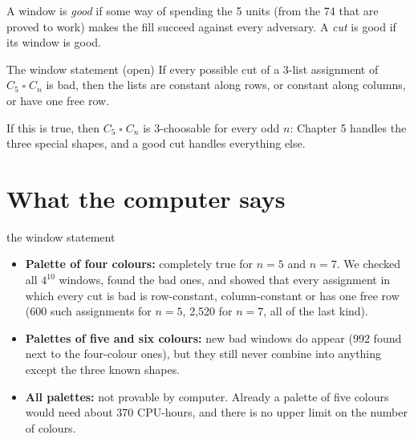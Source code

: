 \documentclass[11pt,oneside,openany]{book}
\newcommand{\T}{\mathbin{\square}}
\begin{document}
\begin{center}
\end{center}

A window is \emph{good} if some way of spending the 5 units (from the 74 that are proved to work)
makes the fill succeed against every adversary. A \emph{cut} is good if its window is good.

\begin{definitionbox}{The window statement (open)}
If every possible cut of a 3-list assignment of $C_5 \T C_n$ is bad, then the lists are constant
along rows, or constant along columns, or have one free row.
\end{definitionbox}

If this is true, then $C_5 \T C_n$ is 3-choosable for every odd $n$: Chapter 5 handles the three
special shapes, and a good cut handles everything else.

\section{What the computer says}

\begin{partialbox}{the window statement}
\begin{itemize}
\item \textbf{Palette of four colours:} completely true for $n = 5$ and $n = 7$. We checked all
$4^{10}$ windows, found the bad ones, and showed that every assignment in which every cut is bad
is row-constant, column-constant or has one free row (600 such assignments for $n=5$, 2,520 for
$n=7$, all of the last kind).
\item \textbf{Palettes of five and six colours:} new bad windows do appear (992 found next to the four-colour
ones), but they still never combine into anything except the three known shapes.
\item \textbf{All palettes:} not provable by computer. Already a palette of five colours would need about 370
CPU-hours, and there is no upper limit on the number of colours.
\end{itemize}
\end{partialbox}
\end{document}
